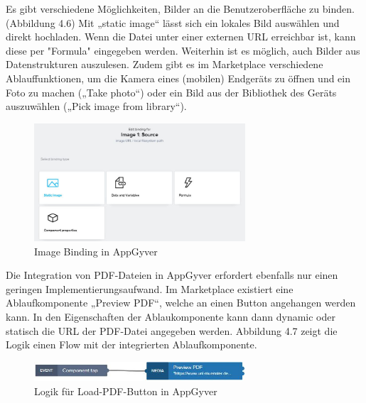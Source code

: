 Es gibt verschiedene Möglichkeiten, Bilder an die Benutzeroberfläche zu binden. (Abbildung 4.6) Mit „static image“ lässt sich ein lokales Bild auswählen und direkt hochladen. Wenn die Datei unter einer externen URL erreichbar ist, kann diese per "Formula" eingegeben werden. Weiterhin ist es möglich, auch Bilder aus Datenstrukturen auszulesen. Zudem gibt es im Marketplace verschiedene Ablauffunktionen, um die Kamera eines (mobilen) Endgeräts zu öffnen und ein Foto zu machen („Take photo“) oder ein Bild aus der Bibliothek des Geräts auszuwählen („Pick image from library“).

\begin{figure}[htbp]
 \centering
 \includegraphics[width=0.7\textwidth]{Bilder/appgyver/4_6_Image_binding_in_AppGyver.jpg}
 \caption{Image Binding in AppGyver}
\end{figure}

Die Integration von PDF-Dateien in AppGyver erfordert ebenfalls nur einen geringen Implementierungsaufwand. Im Marketplace existiert eine Ablaufkomponente „Preview PDF“, welche an einen Button angehangen werden kann. In den Eigenschaften der Ablaukomponente kann dann dynamic oder statisch die URL der PDF-Datei angegeben werden. Abbildung 4.7 zeigt die Logik einen Flow mit der integrierten Ablaufkomponente. 

\begin{figure}[htbp]
 \centering
 \includegraphics[width=0.7\textwidth]{Bilder/appgyver/4_7_Logik_Load-PDF-Button.jpg}
 \caption{Logik für Load-PDF-Button in AppGyver}
\end{figure}


